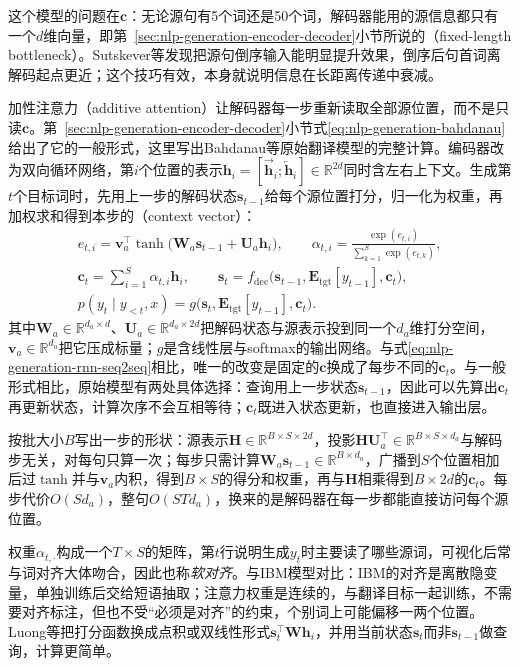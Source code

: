 这个模型的问题在$\bm c$：无论源句有5个词还是50个词，解码器能用的源信息都只有一个$d$维向量，即第~\ref{sec:nlp-generation-encoder-decoder}小节所说的（fixed-length bottleneck）。Sutskever等发现把源句倒序输入能明显提升效果，倒序后句首词离解码起点更近；这个技巧有效，本身就说明信息在长距离传递中衰减。

加性注意力（additive attention）让解码器每一步重新读取全部源位置，而不是只读$\bm c$。第~\ref{sec:nlp-generation-encoder-decoder}小节式\eqref{eq:nlp-generation-bahdanau}给出了它的一般形式，这里写出Bahdanau等原始翻译模型的完整计算。编码器改为双向循环网络，第$i$个位置的表示$\bm h_i=[\overrightarrow{\bm h}_i;\overleftarrow{\bm h}_i]\in\mathbb R^{2d}$同时含左右上下文。生成第$t$个目标词时，先用上一步的解码状态$\bm s_{t-1}$给每个源位置打分，归一化为权重，再加权求和得到本步的（context vector）：
\begin{equation}
  \begin{gathered}
  e_{t,i}=\bm v_a^{\top}\tanh\bigl(\bm W_a\bm s_{t-1}+\bm U_a\bm h_i\bigr),\qquad
  \alpha_{t,i}=\frac{\exp(e_{t,i})}{\sum_{k=1}^{S}\exp(e_{t,k})},\\
  \bm c_t=\sum_{i=1}^{S}\alpha_{t,i}\bm h_i,\qquad
  \bm s_t=f_{\mathrm{dec}}\bigl(\bm s_{t-1},\bm E_{\mathrm{tgt}}[y_{t-1}],\bm c_t\bigr),\\
  p(y_t\mid y_{<t},x)=g\bigl(\bm s_t,\bm E_{\mathrm{tgt}}[y_{t-1}],\bm c_t\bigr).
  \end{gathered}
  \label{eq:nlp-generation-bahdanau-mt}
\end{equation}
其中$\bm W_a\in\mathbb R^{d_a\times d}$、$\bm U_a\in\mathbb R^{d_a\times 2d}$把解码状态与源表示投到同一个$d_a$维打分空间，$\bm v_a\in\mathbb R^{d_a}$把它压成标量；$g$是含线性层与softmax的输出网络。与式\eqref{eq:nlp-generation-rnn-seq2seq}相比，唯一的改变是固定的$\bm c$换成了每步不同的$\bm c_t$。与一般形式相比，原始模型有两处具体选择：查询用上一步状态$\bm s_{t-1}$，因此可以先算出$\bm c_t$再更新状态，计算次序不会互相等待；$\bm c_t$既进入状态更新，也直接进入输出层。

按批大小$B$写出一步的形状：源表示$\bm H\in\mathbb R^{B\times S\times 2d}$，投影$\bm H\bm U_a^{\top}\in\mathbb R^{B\times S\times d_a}$与解码步无关，对每句只算一次；每步只需计算$\bm W_a\bm s_{t-1}\in\mathbb R^{B\times d_a}$，广播到$S$个位置相加后过$\tanh$并与$\bm v_a$内积，得到$B\times S$的得分和权重，再与$\bm H$相乘得到$B\times 2d$的$\bm c_t$。每步代价$O(Sd_a)$，整句$O(STd_a)$，换来的是解码器在每一步都能直接访问每个源位置。

权重$\alpha_{t,\cdot}$构成一个$T\times S$的矩阵，第$t$行说明生成$y_t$时主要读了哪些源词，可视化后常与词对齐大体吻合，因此也称\emph{软对齐}。与IBM模型对比：IBM的对齐是离散隐变量，单独训练后交给短语抽取；注意力权重是连续的，与翻译目标一起训练，不需要对齐标注，但也不受“必须是对齐”的约束，个别词上可能偏移一两个位置。Luong等把打分函数换成点积或双线性形式$\bm s_t^{\top}\bm W\bm h_i$，并用当前状态$\bm s_t$而非$\bm s_{t-1}$做查询，计算更简单。


